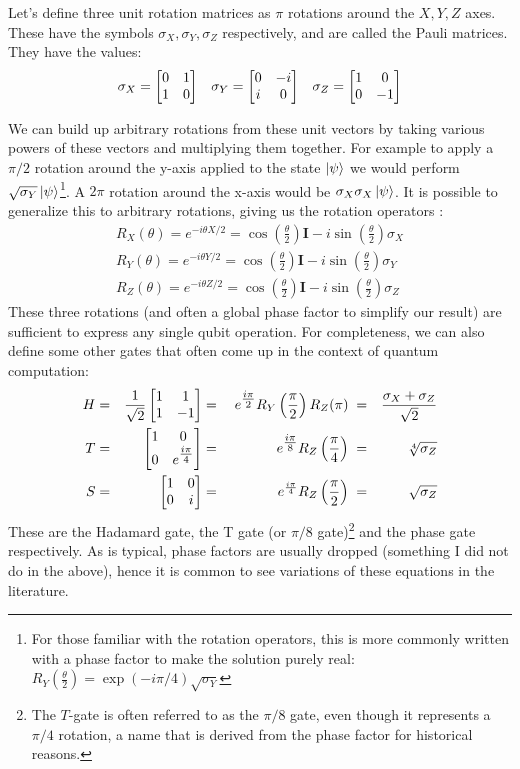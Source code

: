 Let's define three unit rotation matrices as $\pi$ rotations around the $X, Y, Z$ axes. These have the symbols
$\sigma_X, \sigma_Y, \sigma_Z$ respectively, and are called the Pauli matrices.
They have the values:
\begin{align}
  \sigma_X = \begin{bmatrix}0&1\\1&0\end{bmatrix} && \sigma_Y = \begin{bmatrix}0&-i\\i&0\end{bmatrix} && \sigma_Z = \begin{bmatrix}1&0\\0&-1\end{bmatrix}
  \label{eq:pauli}
\end{align}

We can build up arbitrary rotations from these unit vectors by taking various powers of these vectors
and multiplying them together. For example to apply a $\pi/2$ rotation around the y-axis applied to the state $\ket{\psi}$
we would perform $\sqrt{\sigma_Y}\ket{\psi}$\footnote{For those familiar with the rotation operators,
this is more commonly written with a phase factor to make the solution purely real: $R_Y(\tfrac{\theta}{2})
= \exp(-i\pi/4)\sqrt{\sigma_Y}$}.
A $2\pi$ rotation around the x-axis would be $\sigma_X\sigma_X\ket{\psi}$. It is possible to generalize this
to arbitrary rotations, giving us the rotation operators \cite{Nielsen:rot}:
\begin{align}
  R_X(\theta) = e^{-i \theta X/2} = \cos\left(\frac{\theta}{2}\right)\boldsymbol{I} - i \sin\left(\frac{\theta}{2}\right)\sigma_X \\
  R_Y(\theta) = e^{-i \theta Y/2} = \cos\left(\frac{\theta}{2}\right)\boldsymbol{I} - i \sin\left(\frac{\theta}{2}\right)\sigma_Y \\
  R_Z(\theta) = e^{-i \theta Z/2} = \cos\left(\frac{\theta}{2}\right)\boldsymbol{I} - i \sin\left(\frac{\theta}{2}\right)\sigma_Z
\end{align}
These three rotations (and often a global phase factor to simplify our result) are sufficient to express
any single qubit operation. For completeness, we can also define some other gates that often come up in
the context of quantum computation:
\begin{alignat}{4}
    H &=& \frac{1}{\sqrt{2}}\begin{bmatrix}1&1\\1&-1\end{bmatrix} &=& \; e^{\tfrac{i\pi}{2}} R_Y\left(\frac{\pi}{2}\right) R_Z(\pi) \; &=& \frac{\sigma_X+\sigma_Z}{\sqrt{2}} \\
    T &=& \begin{bmatrix}1&0\\0&e^{\tfrac{i\pi}{4}}\end{bmatrix}  &=& \; e^{\tfrac{i\pi}{8}} R_Z\left(\frac{\pi}{4}\right)          \; &=& \sqrt[4]{\sigma_Z} \\
    S &=& \begin{bmatrix}1&0\\0&i\end{bmatrix}                    &=& \; e^{\frac{i \pi}{4}} R_Z\left(\frac{\pi}{2}\right)          \; &=& \sqrt{\sigma_Z}
\end{alignat}
These are the Hadamard gate, the T gate (or $\pi/8$ gate)\footnote{The $T$-gate is often
referred to as the $\pi/8$ gate, even though it represents a $\pi/4$ rotation, a name that is derived from
the phase factor for historical reasons.} and the phase gate respectively.
As is typical, phase factors are usually dropped (something I did not do in the above), hence it is
common to see variations of these equations in the literature.

